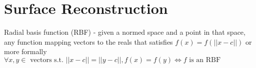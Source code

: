 \section{Surface Reconstruction}
\begin{framed}
Radial basis function (RBF) - given a normed space and a point in that space, any function mapping vectors to the reals that satisfies $f(x) = f(||x - c||)$ or more formally $\forall x,y \in \text{ vectors s.t. } ||x - c|| = ||y - c||,  f(x) = f(y) \iff f\text{ is an RBF}$
\end{framed}
